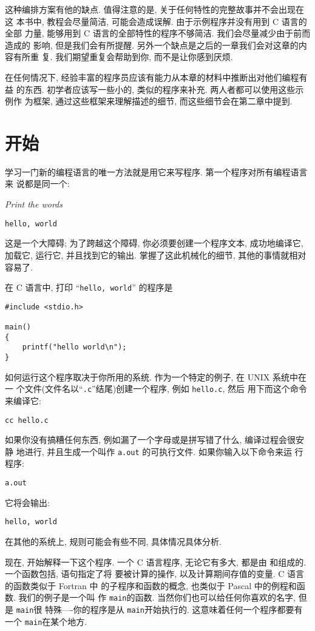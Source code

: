 \documentclass[nofonts, a4paper, oneside, 10pt]{ctexbook}
\newcommand\cemph[1]{{\small{\CJKfamily{kai}{#1}}}}
\numberwithin{exercnt}{chapter}
\begin{document}
这种编排方案有他的缺点. 值得注意的是, 关于任何特性的完整故事并不会出现在这
本书中, 教程会尽量简洁, 可能会造成误解. 由于示例程序并没有用到 C 语言的全部
力量, 能够用到 C 语言的全部特性的程序不够简洁. 我们会尽量减少由于前而造成的
影响, 但是我们会有所提醒. 另外一个缺点是之后的一章我们会对这章的内容有所重
复. 我们期望重复会帮助到你, 而不是让你感到厌烦.

在任何情况下, 经验丰富的程序员应该有能力从本章的材料中推断出对他们编程有益
的东西. 初学者应该写一些小的, 类似的程序来补充. 两人者都可以使用这些示例作
为框架, 通过这些框架来理解描述的细节, 而这些细节会在第二章中提到.

\section{开始}
学习一门新的编程语言的唯一方法就是用它来写程序. 第一个程序对所有编程语言来
说都是同一个:

\textit{Print the words}

\verb"hello, world"

这是一个大障碍; 为了跨越这个障碍, 你必须要创建一个程序文本, 成功地编译它, 
加载它, 运行它, 并且找到它的输出. 掌握了这此机械化的细节, 其他的事情就相对
容易了.

在 C 语言中, 打印 ``\verb"hello, world"'' 的程序是
\linespread{0.8}
\begin{verbatim}
#include <stdio.h>

main()
{
    printf("hello world\n");
}
\end{verbatim}

如何运行这个程序取决于你所用的系统. 作为一个特定的例子, 在 UNIX 系统中在一
个文件(文件名以``\verb".c"''结尾)创建一个程序, 例如 \verb"hello.c", 然后
用下而这个命令来编译它:

\verb"cc hello.c"

如果你没有搞糟任何东西, 例如漏了一个字母或是拼写错了什么, 编译过程会很安静
地进行, 并且生成一个叫作 \verb"a.out" 的可执行文件. 如果你输入以下命令来运
行程序:

\verb"a.out"

它将会输出:

\verb"hello, world"

在其他的系统上, 规则可能会有些不同, 具体情况具体分析.

现在, 开始解释一下这个程序. 一个 C 语言程序, 无论它有多大, 都是由%
\cemph{变量}和\cemph{函数}组成的. 一个函数包括\cemph{语句}, 语句指定了将
要被计算的操作, 以及计算期间存值的变量. C 语言的函数类似于 Fortran 中
的子程序和函数的概念, 也类似于 Pascal 中的例程和函数. 我们的例子是一个叫
作 \verb"main"的函数. 当然你们也可以给任何你喜欢的名字, 但是 \verb"main"很
特殊----你的程序是从 \verb"main"开始执行的.  这意味着任何一个程序都要有一个
 \verb"main"在某个地方.
\end{document}
